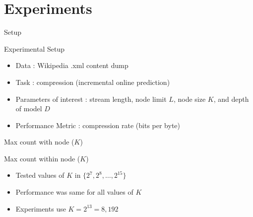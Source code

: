 \documentclass{beamer}
\begin{document}
\section{Experiments}

\begin{frame}[t]{Setup}
	\begin{block}{Experimental Setup}
		\begin{itemize}
			\item Data : Wikipedia .xml content dump
			\item Task : compression (incremental online prediction)
			\item Parameters of interest : stream length, node limit $L$, node size $K$, and depth of model $D$
			\item Performance Metric : compression rate (bits per byte)
		\end{itemize}
	\end{block}
\end{frame}

\begin{frame}[t]{Max count with node ($K$)}
	\begin{block}{Max count within node ($K$)}
		\begin{itemize}
			\item Tested values of $K$ in $\{2^7, 2^8, \ldots, 2^{15} \}$
			\item Performance was same for all values of $K$
			\item Experiments use $K = 2^{13} = 8,192$
		\end{itemize}
	\end{block}
\end{frame}
\end{document}
